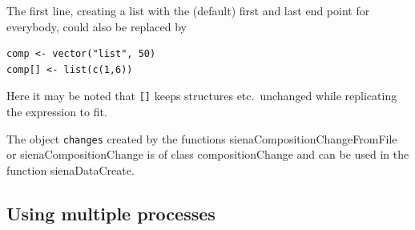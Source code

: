 \documentclass[a4paper,fleqn,11pt]{article}
\newcommand{\+}{\, + \,}
\newcommand{\sfn}[1]{\textsf{#1}}
\begin{document}
The first line, creating a list with the (default) first and
last end point for everybody, could also be replaced by
\begin{verbatim}
comp <- vector("list", 50)
comp[] <- list(c(1,6))
\end{verbatim}
Here it may be noted that \texttt{[]} keeps structures etc.\ unchanged
while replicating the expression to fit.

The object \texttt{changes} created by the functions
\sfn{sienaCompositionChangeFromFile} or
\sfn{sienaCompositionChange} is of class
\sfn{compositionChange} and can be used in the function
\sfn{sienaDataCreate}.

\subsection{Using multiple processes}
\label{S_multipleProcesses}
\end{document}
